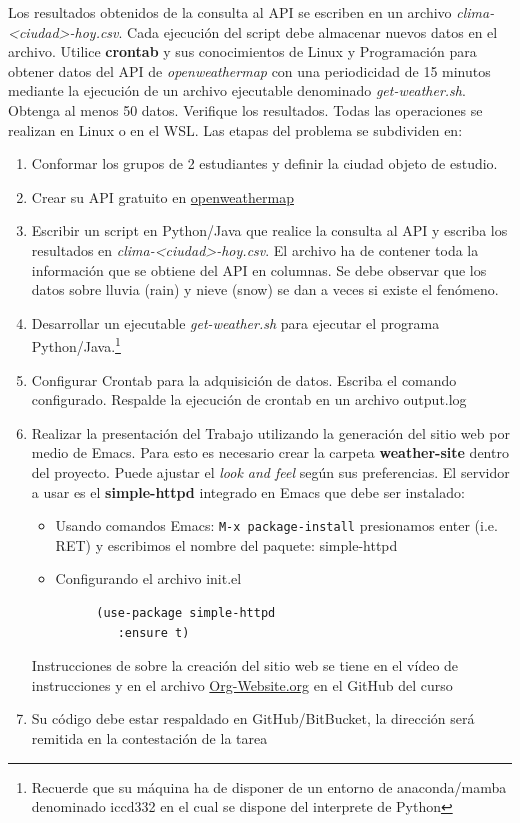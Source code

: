 \documentclass[11pt]{article}
\begin{document}
Los resultados obtenidos de la consulta al API se escriben en un
archivo \emph{clima-<ciudad>-hoy.csv}. Cada ejecución del script debe
almacenar nuevos datos en el archivo. Utilice \textbf{crontab} y sus
conocimientos de Linux y Programación para obtener datos del API de
\emph{openweathermap} con una periodicidad de 15 minutos mediante la
ejecución de un archivo ejecutable denominado
\emph{get-weather.sh}. Obtenga al menos 50 datos. Verifique los
resultados. Todas las operaciones se realizan en Linux o en el
WSL. Las etapas del problema se subdividen en:

\begin{enumerate}
\item Conformar los grupos de 2 estudiantes y definir la ciudad
objeto de estudio.
\item Crear su API gratuito en \href{https://openweathermap.org/current\#one}{openweathermap}
\item Escribir un script en Python/Java que realice la consulta al
API y escriba los resultados en \emph{clima-<ciudad>-hoy.csv}. El
archivo ha de contener toda la información que se obtiene del
API en columnas. Se debe observar que los datos sobre lluvia
(rain) y nieve (snow) se dan a veces si existe el fenómeno.
\item Desarrollar un ejecutable \emph{get-weather.sh} para ejecutar el
programa Python/Java.\footnote{Recuerde que su máquina ha de disponer de un entorno de
anaconda/mamba denominado iccd332 en el cual se dispone del interprete
de Python}
\item Configurar Crontab para la adquisición de datos. Escriba el
comando configurado. Respalde la ejecución de crontab en un
archivo output.log
\item Realizar la presentación del Trabajo utilizando la generación
del sitio web por medio de Emacs. Para esto es necesario crear
la carpeta \textbf{\textbf{weather-site}} dentro del proyecto. Puede ajustar el
\emph{look and feel} según sus preferencias. El servidor a usar es
el \textbf{\textbf{simple-httpd}} integrado en Emacs que debe ser instalado:
\begin{itemize}
\item Usando comandos Emacs: \texttt{M-x package-install} presionamos
enter (i.e. RET) y escribimos el nombre del paquete:
simple-httpd
\item Configurando el archivo init.el
\end{itemize}

\begin{verbatim}
         (use-package simple-httpd
            :ensure t)
\end{verbatim}

Instrucciones de sobre la creación del sitio web se tiene en el
vídeo de instrucciones y en el archivo \href{https://github.com/LeninGF/EPN-Lectures/blob/main/iccd332ArqComp-2024-A/Tutoriales/Org-Website/Org-Website.org}{Org-Website.org} en el
GitHub del curso

\item Su código debe estar respaldado en GitHub/BitBucket, la
dirección será remitida en la contestación de la tarea
\end{enumerate}
\end{document}
